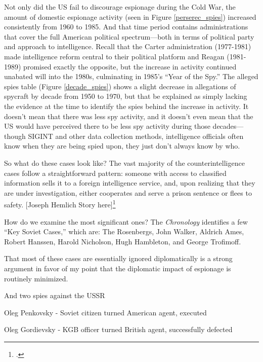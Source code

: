 \documentclass{memoir}
\begin{document}
\begin{refsegment}
Not only did the US fail to discourage espionage during the Cold War, the amount of domestic espionage activity (seen in Figure \ref{perserec_spies}) increased consistently from 1960 to 1985. And that time period contains administrations that cover the full American political spectrum---both in terms of political party and approach to intelligence. Recall that the Carter administration (1977-1981) made intelligence reform central to their political platform and Reagan (1981-1989) promised exactly the opposite, but the increase in activity continued unabated will into the 1980s, culminating in 1985's ``Year of the Spy.'' The alleged spies table (Figure \ref{decade_spies}) shows a slight decrease in allegations of spycraft by decade from 1950 to 1970, but that be explained as simply lacking the evidence at the time to identify the spies behind the increase in activity. It doesn't mean that there was less spy activity, and it doesn't even mean that the US would have perceived there to be less spy activity during those decades---though SIGINT and other data collection methods, intelligence officials often know when they are being spied upon, they just don't always know by who.

So what do these cases look like? The vast majority of the counterintelligence cases follow a straightforward pattern: someone with access to classified information sells it to a foreign intelligence service, and, upon realizing that they are under investigation, either cooperates and serve a prison sentence or flees to safety. [Joseph Hemlich Story here]\footcite{upi_ex-army_1981}

How do we examine the most significant ones? The \emph{Chronology} identifies a few ``Key Soviet Cases,'' which are: The Rosenbergs, John Walker, Aldrich Ames, Robert Hanssen, Harold Nicholson, Hugh Hambleton, and George Trofimoff.

That most of these cases are essentially ignored diplomatically is a strong argument in favor of my point that the diplomatic impact of espionage is routinely minimized.

And two spies against the USSR

Oleg Penkovsky - Soviet citizen turned American agent, executed

Oleg Gordievsky - KGB officer turned British agent, successfully defected



\end{refsegment}
\end{document}
